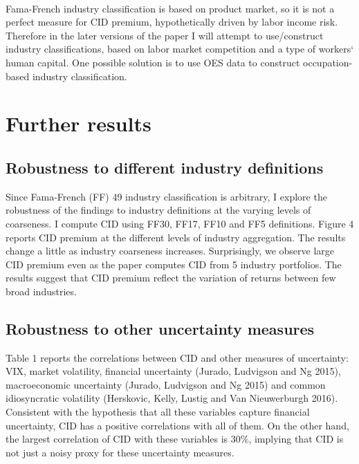 \documentclass[12pt]{article}
\begin{document}
\paragraph{}
Fama-French industry classification is based on product market, so it is not a perfect measure for CID premium, hypothetically driven by labor income risk. Therefore in the later versions of the paper I will attempt to use/construct industry classifications, based on labor market competition and a type of workers` human capital. One possible solution is to use OES data to construct occupation-based industry classification.


\section{Further results} \label{sec:Model}
\subsection{Robustness to different industry definitions}

Since Fama-French (FF) 49 industry classification is arbitrary, I explore the robustness of the findings to industry definitions at the varying levels of coarseness. I compute CID using FF30, FF17, FF10 and FF5 definitions. Figure 4 reports CID premium at the different levels of industry aggregation. The results change a little as industry coarseness increases. Surprisingly, we observe large CID premium even as the paper computes CID from 5 industry portfolios. The results suggest that CID premium reflect the variation of returns between few broad industries.  

\subsection{Robustness to other uncertainty measures}

Table 1 reports the correlations between CID and other measures of uncertainty: VIX, market volatility, financial uncertainty (Jurado, Ludvigson and Ng 2015), macroeconomic uncertainty (Jurado, Ludvigson and Ng 2015) and common idiosyncratic volatility (Herskovic, Kelly, Lustig and Van Nieuwerburgh 2016). Consistent with the hypothesis that all these variables capture financial uncertainty, CID has a positive correlations with all of them. On the other hand, the largest correlation of CID with these variables is 30\%, implying that CID is not just a noisy proxy for these uncertainty measures.
\end{document}
